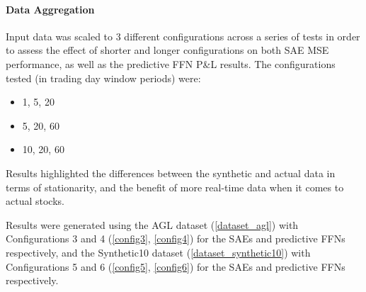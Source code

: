 \documentclass[a4paper,latin]{paper}
\begin{document}



\paragraph{Data Aggregation}

Input data was scaled to 3 different configurations across a series of tests in order to assess the effect of shorter and longer configurations on both SAE MSE performance, as well as the predictive FFN P\&L results. The configurations tested (in trading day window periods) were:

\begin{itemize}
	\item 1, 5, 20
	\item 5, 20, 60
	\item 10, 20, 60
\end{itemize}

Results highlighted the differences between the synthetic and actual data in terms of stationarity, and the benefit of more real-time data when it comes to actual stocks. \newline

Results were generated using the AGL dataset (\ref{dataset_agl}) with Configurations 3 and 4 (\ref{config3}, \ref{config4}) for the SAEs and predictive FFNs respectively, and the Synthetic10 dataset (\ref{dataset_synthetic10}) with Configurations 5 and 6 (\ref{config5}, \ref{config6}) for the  SAEs and predictive FFNs respectively.

\end{document}
